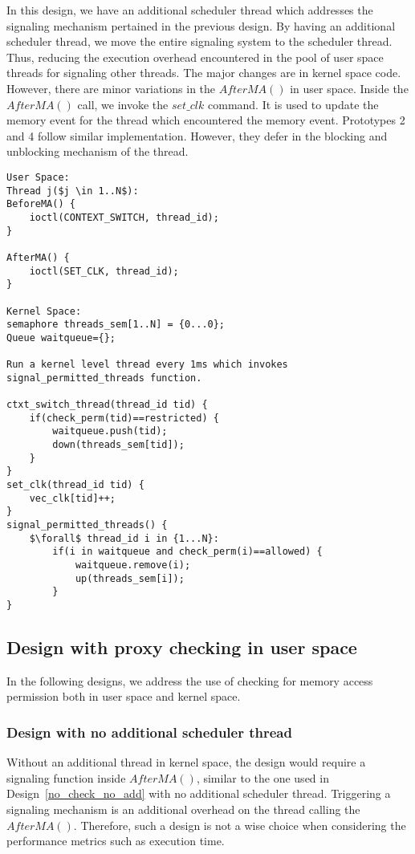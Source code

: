 In this design, we have an additional scheduler thread which addresses the signaling mechanism pertained in the previous design. 
By having an additional scheduler thread, we move the entire signaling system to the scheduler thread.
Thus, reducing the execution overhead encountered in the pool of user space threads for signaling other threads.
The major changes are in kernel space code. 
However, there are minor variations in the $AfterMA()$ in user space. 
Inside the $AfterMA()$ call, we invoke the $set\_clk$ command. 
It is used to update the memory event for the thread which encountered the memory event. 
Prototypes 2 and 4 follow similar implementation. 
However, they defer in the blocking and unblocking mechanism of the thread. 
\newpage
\begin{lstlisting}[mathescape=true,caption={Pseudo Code for Prototype 2}, style=customc,frame=tlrb,label={lst:proto2}]
User Space:
Thread j($j \in 1..N$):
BeforeMA() {	
	ioctl(CONTEXT_SWITCH, thread_id);	
}

AfterMA() {	
	ioctl(SET_CLK, thread_id);
}

Kernel Space:
semaphore threads_sem[1..N] = {0...0};
Queue waitqueue={};

Run a kernel level thread every 1ms which invokes signal_permitted_threads function.

ctxt_switch_thread(thread_id tid) {	
	if(check_perm(tid)==restricted) {
		waitqueue.push(tid);
		down(threads_sem[tid]); 
	}
}
set_clk(thread_id tid) {
	vec_clk[tid]++;
}
signal_permitted_threads() {
	$\forall$ thread_id i in {1...N}:
		if(i in waitqueue and check_perm(i)==allowed) {
			waitqueue.remove(i);
			up(threads_sem[i]);
		}
}
\end{lstlisting}

\subsection{Design with proxy checking in user space\label{proxycheck}}

In the following designs, we address the use of checking for memory access permission both in user space and kernel space.

\subsubsection{Design with no additional scheduler thread}

Without an additional thread in kernel space, the design would require a signaling function inside $AfterMA()$, similar to the one used in Design~\ref{no_check_no_add} with no additional scheduler thread. 
Triggering a signaling mechanism is an additional overhead on the thread calling the $AfterMA()$. 
Therefore, such a design is not a wise choice when considering the performance metrics such as execution time.
 
